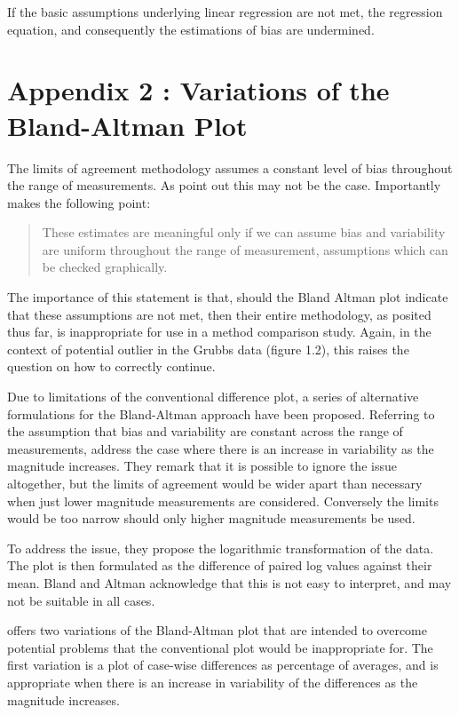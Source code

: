 \documentclass[12pt, a4paper]{report}
\theoremstyle{plain}
\theoremstyle{definition}
\theoremstyle{remark}
\begin{document}
	
	If the basic assumptions underlying linear regression are not met, the regression equation, and consequently the estimations of bias are undermined. 
	

\section{Appendix 2 : Variations of the Bland-Altman Plot} 
The limits of agreement methodology assumes a constant level of bias throughout the range of measurements. As \citet*{BA86} point out this may not be the case. 
Importantly \citet{BA99} makes the following point:
\begin{quote}These estimates are meaningful only if we can assume
	bias and variability are uniform throughout the range of
	measurement, assumptions which can be checked graphically.
	\end{quote}
	
	The importance of this statement is that, should the Bland Altman plot indicate that these assumptions are not met, then their
	entire methodology, as posited thus far, is inappropriate for use
	in a method comparison study. Again, in the context of potential
	outlier in the Grubbs data (figure 1.2), this raises the question
	on how to correctly continue. 
	
	Due to limitations of the conventional difference plot, a series of alternative formulations for the Bland-Altman approach have been proposed. Referring to the assumption that bias and variability are constant across the range of measurements, \citet{BA99} address the case where there is an increase in variability as the magnitude increases. They remark that it is possible to ignore the issue altogether, but the limits of agreement would be wider apart than necessary when just lower magnitude measurements are considered. Conversely the limits would be too narrow should only higher magnitude measurements be used. 
	
	To address the issue, they propose the logarithmic transformation of the data. The plot is then formulated as the difference of paired log values against their mean. Bland and Altman acknowledge that this is not easy to interpret, and may not be suitable in all cases.
	
	\citet{BA99} offers two variations of the Bland-Altman plot that are intended to overcome potential problems that the conventional plot would be inappropriate for. The first variation is a plot of case-wise differences as percentage of averages, and is appropriate when there is an increase in variability of the differences as the magnitude increases. 
	
\end{document}
